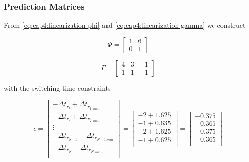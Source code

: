 \subsubsection{Prediction Matrices}

From \eqref{eq:cap4:linearization-phi} and \eqref{eq:cap4:linearization-gamma} we construct

\begin{equation}
    \Phi =
    \left[
    \begin{matrix}
        1 & 6 \\
        0 & 1
    \end{matrix}
    \right]
\end{equation}

\begin{equation}
    \Gamma =
    \left[
    \begin{matrix}
        4 & 3 & -1 \\
        1 & 1 & -1
    \end{matrix}
    \right]
\end{equation}

\noindent
with the switching time constraints

\begin{equation}
    c = 
    \left[
        \begin{matrix}
            -\Delta t_{r_1} + \Delta t_{r_{1, min}} \\
            -\Delta t_{r_2} + \Delta t_{r_{2, min}} \\
            \vdots \\
            -\Delta t_{r_{N-1}} + \Delta t_{r_{{N-1}, min}} \\
            -\Delta t_{r_N} + \Delta t_{r_{N, min}} \\
        \end{matrix}
    \right] = 
    \left[
        \begin{matrix}
            - 2 + 1.625 \\
            - 1 + 0.635 \\
            - 2 + 1.625 \\
            - 1 + 0.625 \\
        \end{matrix}
    \right] =
    \left[
        \begin{matrix}
            - 0.375 \\
            - 0.365 \\
            - 0.375 \\
            - 0.365 \\
        \end{matrix}
    \right]
\end{equation}

